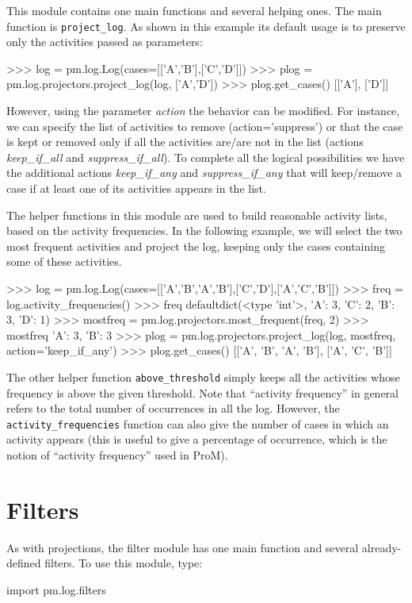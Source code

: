\documentclass[a4paper,10pt]{book}
\begin{document}
This module contains one main functions and several helping ones. The main function is \texttt{project\_log}. As shown in this example its default usage is to preserve only the activities passed as parameters:\\
\begin{pycode}
>>> log = pm.log.Log(cases=[['A','B'],['C','D']])
>>> plog = pm.log.projectors.project_log(log, ['A','D'])
>>> plog.get_cases()
[['A'], ['D']]
\end{pycode}

However, using the parameter \emph{action} the behavior can be modified. For instance, we can specify the list of activities to remove (action='suppress') or that the case is kept or removed only if all the activities are/are not in the list (actions \emph{keep\_if\_all} and \emph{suppress\_if\_all}). To complete all the logical possibilities we have the additional actions \emph{keep\_if\_any} and \emph{suppress\_if\_any} that will keep/remove a case if at least one of its activities appears in the list.

The helper functions in this module are used to build reasonable activity lists, based on the activity frequencies. In the following example, we will select the two most frequent activities and project the log, keeping only the cases containing some of these activities.\\
\begin{pycode}
>>> log = pm.log.Log(cases=[['A','B','A','B'],['C','D'],['A','C','B']])
>>> freq = log.activity_frequencies()
>>> freq
defaultdict(<type 'int'>, {'A': 3, 'C': 2, 'B': 3, 'D': 1})
>>> mostfreq = pm.log.projectors.most_frequent(freq, 2)
>>> mostfreq
{'A': 3, 'B': 3}
>>> plog = pm.log.projectors.project_log(log, mostfreq, action='keep_if_any')
>>> plog.get_cases()
[['A', 'B', 'A', 'B'], ['A', 'C', 'B']]
\end{pycode}

The other helper function \texttt{above\_threshold} simply keeps all the activities whose frequency is above the given threshold. Note that ``activity frequency'' in general refers to the total number of occurrences in all the log. However, the \texttt{activity\_frequencies} function can also give the number of cases in which an activity appears (this is useful to give a percentage of occurrence, which is the notion of ``activity frequency'' used in ProM).

\section{Filters}
As with projections, the filter module has one main function and several already-defined filters. To use this module, type:\\
\begin{pycode}
import pm.log.filters
\end{pycode}
\end{document}
